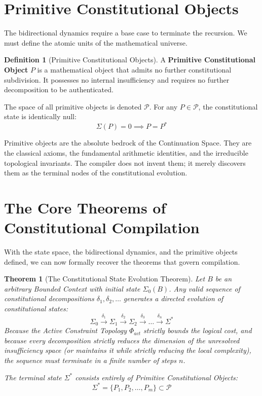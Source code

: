 \documentclass[12pt,openany]{extbook}
\theoremstyle{plain}
\newtheorem{theorem}{Theorem}[chapter]
\theoremstyle{definition}
\newtheorem{definition}{Definition}[chapter]
\begin{document}
\section{Primitive Constitutional Objects}

The bidirectional dynamics require a base case to terminate the recursion. We must define the atomic units of the mathematical universe.

\begin{definition}[Primitive Constitutional Objects]
A \textbf{Primitive Constitutional Object} $P$ is a mathematical object that admits no further constitutional subdivision. It possesses no internal insufficiency and requires no further decomposition to be authenticated. 

The space of all primitive objects is denoted $\mathcal{P}$. For any $P \in \mathcal{P}$, the constitutional state is identically null:
\[
\Sigma(P) = 0 \implies P = P^*
\]
\end{definition}

Primitive objects are the absolute bedrock of the Continuation Space. They are the classical axioms, the fundamental arithmetic identities, and the irreducible topological invariants. The compiler does not invent them; it merely discovers them as the terminal nodes of the constitutional evolution.

\section{The Core Theorems of Constitutional Compilation}

With the state space, the bidirectional dynamics, and the primitive objects defined, we can now formally recover the theorems that govern compilation.

\begin{theorem}[The Constitutional State Evolution Theorem]
Let $B$ be an arbitrary Bounded Context with initial state $\Sigma_0(B)$. Any valid sequence of constitutional decompositions $\delta_1, \delta_2, \dots$ generates a directed evolution of constitutional states:
\[
\Sigma_0 \xrightarrow{\delta_1} \Sigma_1 \xrightarrow{\delta_2} \Sigma_2 \xrightarrow{\delta_3} \dots \xrightarrow{\delta_n} \Sigma^*
\]
Because the Active Constraint Topology $\Phi_{act}$ strictly bounds the logical cost, and because every decomposition strictly reduces the dimension of the unresolved insufficiency space (or maintains it while strictly reducing the local complexity), the sequence must terminate in a finite number of steps $n$. 

The terminal state $\Sigma^*$ consists entirely of Primitive Constitutional Objects:
\[
\Sigma^* = \{P_1, P_2, \dots, P_m\} \subset \mathcal{P}
\]
\end{theorem}
\end{document}
